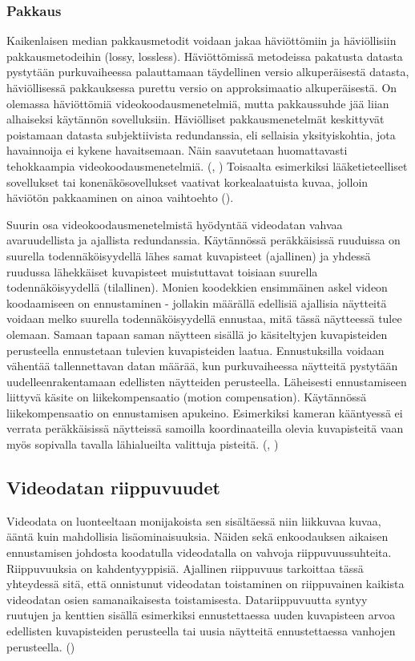 \subsubsection{Pakkaus}

Kaikenlaisen median pakkausmetodit voidaan jakaa häviöttömiin
ja häviöllisiin pakkausmetodeihin (lossy, lossless). Häviöttömissä metodeissa pakatusta datasta
pystytään purkuvaiheessa palauttamaan täydellinen versio alkuperäisestä
datasta, häviöllisessä pakkauksessa purettu versio on approksimaatio
alkuperäisestä. On olemassa häviöttömiä videokoodausmenetelmiä, mutta
pakkaussuhde jää liian alhaiseksi käytännön sovelluksiin. Häviölliset
pakkausmenetelmät keskittyvät poistamaan datasta subjektiivista redundanssia,
eli sellaisia yksityiskohtia, jota havainnoija ei kykene havaitsemaan. Näin
saavutetaan huomattavasti tehokkaampia videokoodausmenetelmiä. (\citealt{h264}, \citealt{du})
Toisaalta esimerkiksi lääketieteelliset sovellukset tai konenäkösovellukset
vaativat korkealaatuista kuvaa, jolloin häviötön pakkaaminen on ainoa
vaihtoehto (\citealt{xu}).

Suurin osa videokoodausmenetelmistä hyödyntää videodatan vahvaa
avaruudellista ja ajallista redundanssia. Käytännössä peräkkäisissä
ruuduissa on suurella todennäköisyydellä lähes samat kuvapisteet (ajallinen) ja
yhdessä ruudussa lähekkäiset kuvapisteet muistuttavat toisiaan suurella
todennäköisyydellä (tilallinen). Monien koodekkien ensimmäinen askel videon koodaamiseen
on ennustaminen - jollakin määrällä edellisiä ajallisia näytteitä voidaan
melko suurella todennäköisyydellä ennustaa, mitä tässä näytteessä tulee
olemaan. Samaan tapaan saman näytteen sisällä jo käsiteltyjen kuvapisteiden
perusteella ennustetaan tulevien kuvapisteiden laatua. Ennustuksilla voidaan
vähentää tallennettavan datan määrää, kun purkuvaiheessa näytteitä pystytään
uudelleenrakentamaan edellisten näytteiden perusteella. Läheisesti
ennustamiseen liittyvä käsite on liikekompensaatio (motion compensation).
Käytännössä liikekompensaatio on ennustamisen apukeino. Esimerkiksi kameran
kääntyessä ei verrata peräkkäisissä näytteissä samoilla koordinaateilla
olevia kuvapisteitä vaan myös sopivalla tavalla lähialueilta valittuja
pisteitä. (\citealt{h264}, \citealt{du})

\subsection{Videodatan riippuvuudet}

Videodata on luonteeltaan monijakoista sen sisältäessä niin liikkuvaa kuvaa,
ääntä kuin mahdollisia lisäominaisuuksia. Näiden sekä
enkoodauksen aikaisen ennustamisen johdosta koodatulla videodatalla on vahvoja
riippuvuussuhteita. Riippuvuuksia on kahdentyyppisiä. Ajallinen riippuvuus
tarkoittaa tässä yhteydessä sitä, että onnistunut videodatan
toistaminen on riippuvainen kaikista videodatan osien samanaikaisesta
toistamisesta. Datariippuvuutta syntyy ruutujen ja kenttien
sisällä esimerkiksi ennustettaessa uuden kuvapisteen arvoa edellisten
kuvapisteiden perusteella tai uusia näytteitä ennustettaessa  vanhojen
perusteella. (\citealt{mujal})

